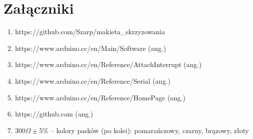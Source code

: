 \documentclass[a4paper,12pt, twoside]{article}
\let\oldsection\section		%
\renewcommand\section{\clearpage\oldsection}%
\begin{document}
\section*{Załączniki}
\begin{enumerate}
	\item \label{itm:Git_makieta} https://github.com/Szarp/makieta\_skrzyzowania
	\item \label{itm:Download_Arduino} https://www.arduino.cc/en/Main/Software (ang.)
	\item \label{itm:InterruptPin} https://www.arduino.cc/en/Reference/AttachInterrupt (ang.)
	\item \label{itm:Serial} https://www.arduino.cc/en/Reference/Serial (ang.)
	\item \label{itm:Ref} https://www.arduino.cc/en/Reference/HomePage (ang.)
	\item \label{itm:Github} https://github.com (ang.)
	\item \label{itm:wynik} $300\Omega \pm 5\%$ -- kolory pasków (po kolei): pomarańczowy, czarny, brązowy, złoty
\end{enumerate}




\newpage
 

\end{document}
